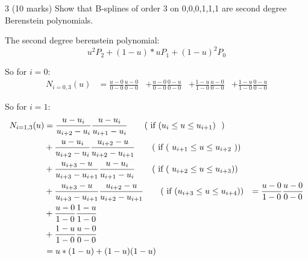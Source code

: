 3 (10 marks) Show that B-splines of order 3 on {0,0,0,1,1,1} are second degree Berenstein polynomials.

The second degree berenstein polynomial:
$$ u^2 P_2 + (1-u)*u P_1 + (1-u)^2 P_0 $$

So for $i=0$:
\begin{align*}
N_{i=0,3}(u)
            &= \frac {u - 0} {0 - 0} \frac{u - 0} {0 - 0} %
            &+ \frac {u - 0} {0 - 0} \frac{0 - u} {0 - 0} %
            &+ \frac {1 - u} { 1 - 0}\frac{u - 0} {0 - 0} %
            &+ \frac {1 - u} { 1 - 0}\frac{0 - u} {0 - 0} %
\end{align*}


So for $i=1$:
\begin{align*}
N_{i=1,3}(u)
            &= \frac {u - u_{i}} {u_{i+2} - u_{i}} \frac{u - u_{i}} {u_{i+1} - u_{i}}  \tag{\text{ if ($ u_i \leq u \leq u_{i+1} $) } } \\
            &+ \frac {u - u_{i}} {u_{i+2} - u_{i}}  \frac{u_{i+2} - u } { u_{i+2} - u_{i+1}}  \tag{\text{ if ( $u_{i+1} \leq u \leq u_{i+2}$ )}} \\
            &+ \frac {u_{i+3} - u} { u_{i+3} - u_{i+1}} \frac {u - u_{i}} {u_{i+1} - u_{i}} \tag{\text{ if ( $u_{i+2} \leq u \leq u_{i+3} $)}} \\
            &+ \frac {u_{i+3} - u} { u_{i+3} - u_{i+1}} \frac{u_{i+2} - u } { u_{i+2} - u_{i+1} } \tag{\text{ if ($ u_{i+3} \leq u \leq u_{i+4} $)}}
            &= \frac {u - 0} {1 - 0} \frac{u - 0}  {0 - 0} \\
            &+ \frac {u - 0} {1 - 0} \frac{1 - u } { 1 - 0} \\
            &+ \frac {1 - u} {1 - 0} \frac{u - 0 } { 0 - 0} \\
            &= u*(1-u) + (1-u)(1-u)
\end{align*}

